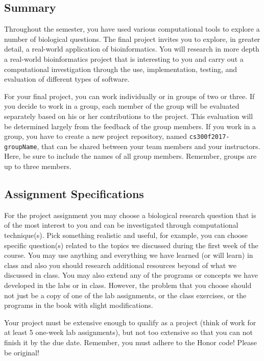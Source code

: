 

\subsection*{Summary}
Throughout the semester, you have used various computational tools to explore a number of biological questions. The final project invites you to explore, in greater detail, a real-world application of bioinformatics. You will research in more depth a real-world bioinformatics project that is interesting to you and carry out a computational investigation through the use, implementation, testing, and evaluation of different types of software.

\noindent For your final project, you can work individually or in groups of two or three. If you decide to work in a group, each member of the group will be evaluated separately based on his or her contributions to the project. This evaluation will be determined largely from the feedback of the group members. If you work in a group, you have to create a new project repository, named {\tt cs300f2017-groupName}, that can be shared between your team members and your instructors. Here, be sure to include the names of all group members. Remember, groups are up to three members. 

\subsection*{Assignment Specifications}
For the project assignment you may choose a biological research question that is of the most interest to you and can be investigated through computational technique(s). Pick something realistic and useful, for example, you can choose specific question(s) related to the topics we discussed during the first week of the course. You may use anything and everything we have learned (or will learn) in class and also you should research additional resources beyond of what we discussed in class. You may also extend any of the programs or concepts we have developed in the labs or in class. However, the problem that you choose should not just be a copy of one of the lab assignments, or the class exercises, or the programs in the book with slight modifications.


Your project must be extensive enough to qualify as a project (think of work for at least 5 one-week lab assignments), but not too extensive so that you can not finish it by the due date. Remember, you must adhere to the Honor code! Please be original!

